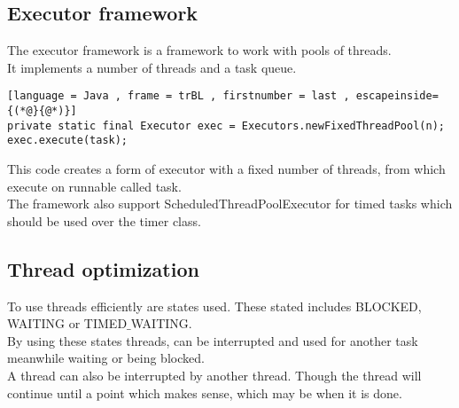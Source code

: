 \documentclass[12pt, a4paper]{article}
\begin{document}
		\subsection{Executor framework}
			The executor framework is a framework to work with pools of threads.\\
			It implements a number of threads and a task queue.
	\begin{lstlisting}[language = Java , frame = trBL , firstnumber = last , escapeinside={(*@}{@*)}]
private static final Executor exec = Executors.newFixedThreadPool(n);
exec.execute(task);
\end{lstlisting}
			This code creates a form of executor with a fixed number of threads, from which execute on runnable called task.\\
			The framework also support ScheduledThreadPoolExecutor for timed tasks which should be used over the timer class.
		\subsection{Thread optimization}
			To use threads efficiently are states used. These stated includes BLOCKED, WAITING or TIMED$\_$WAITING.\\
			By using these states threads, can be interrupted and used for another task meanwhile waiting or being blocked.\\
			A thread can also be interrupted by another thread. Though the thread will continue until a point which makes sense, which may be when it is done.
\end{document}
